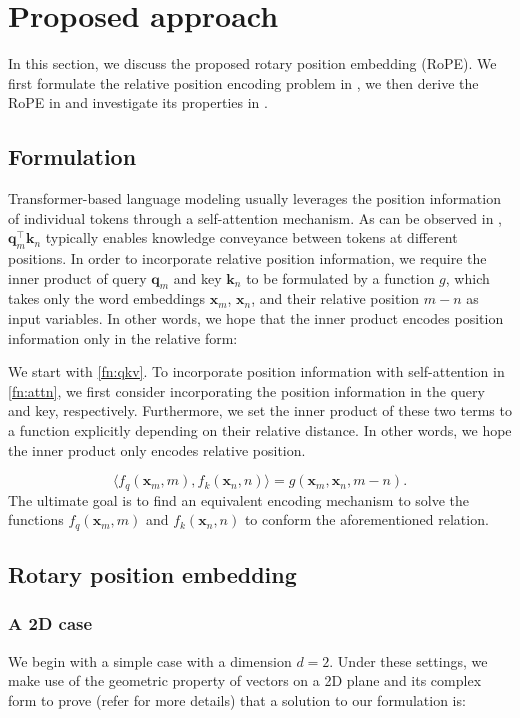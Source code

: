 \documentclass{article}
\def\q{{\boldsymbol q}}
\def\k{{\boldsymbol k}}
\def\x{{\boldsymbol x}}
\begin{document}
\section{Proposed approach}
\label{sec:approach}
In this section, we discuss the proposed rotary position embedding (RoPE). We first formulate the relative position encoding problem in  , we then derive the RoPE in  and investigate its properties in  . 

\subsection{Formulation}
\label{sec:formulation}
Transformer-based language modeling usually leverages the position information of individual tokens through a self-attention mechanism. As can be observed in , $\q_m^{\intercal}\k_n$ typically enables knowledge conveyance between tokens at different positions. In order to incorporate relative position information, we require the inner product of query $\q_m$ and key $\k_n$ to be formulated by a function $g$, which takes only the word embeddings $\x_m$, $\x_n$, and their relative position $m -n$ as input variables. In other words, we hope that the inner product encodes position information only in the relative form:

\if We start with \cref{fn:qkv}. To incorporate position information with self-attention in \cref{fn:attn}, we first consider incorporating the position information in the query and key, respectively.  Furthermore, we set the inner product of these two terms to a function explicitly depending on their relative distance. In other words, we hope the inner product only encodes relative position. \fi

\begin{equation}
	\langle f_q(\x_m, m),f_k(\x_n, n)\rangle=g(\x_m,\x_n,m-n).
	\label{fn:formulation}
\end{equation}
The ultimate goal is to find an equivalent encoding mechanism to solve the functions $f_q(\x_m, m)$ and $f_k(\x_n, n)$ to conform the aforementioned relation. 

\subsection{Rotary position embedding}
\label{sec:RoPE}

\subsubsection{A 2D case}
We begin with a simple case with a dimension $d=2$. Under these settings, we make use of the geometric property of vectors on a 2D plane and its complex form to prove (refer  for more details) that a solution to our formulation  is: 
\end{document}
